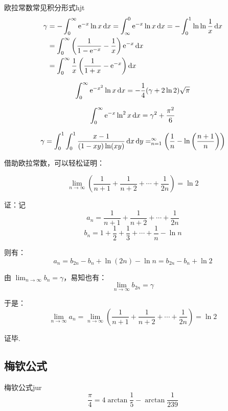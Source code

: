 \documentclass[12pt, cn]{elegantart}
\begin{document}
\begin{definition}{欧拉常数常见积分形式}{hjt}
	\begin{align*} 
	\gamma &=-\int_{0}^{\infty} \mathrm{e}^{-x} \ln x \mathop{}\!\mathrm{d} x=\int_{\infty}^{0} \mathrm{e}^{-x} \ln x \mathop{}\!\mathrm{d} x=-\int_{0}^{1} \ln \ln \frac{1}{x} \mathop{}\!\mathrm{d} x \\ &=\int_{0}^{\infty}\left(\frac{1}{1-\mathrm{e}^{-x}}-\frac{1}{x}\right) \mathrm{e}^{-x} \mathop{}\!\mathrm{d} x \\ &=\int_{0}^{\infty} \frac{1}{x}\left(\frac{1}{1+x}-\mathrm{e}^{-x}\right) \mathop{}\!\mathrm{d} x
	\end{align*}
	
	\begin{equation*}
		\int_{0}^{\infty} \mathrm{e}^{-x^{2}} \ln x \mathop{}\!\mathrm{d} x=-\frac{1}{4}(\gamma+2 \ln 2) \sqrt{\pi}
	\end{equation*}
	
	\begin{equation*}
		\int_{0}^{\infty} \mathrm{e}^{-x} \ln ^{2} x \mathop{}\!\mathrm{d} x=\gamma^{2}+\frac{\pi^{2}}{6}
	\end{equation*}
	
	\begin{equation*}
		\gamma=\int_{0}^{1} \int_{0}^{1} \frac{x-1}{(1-x y) \ln (x y)} \mathop{}\!\mathrm{d} x \mathop{}\!\mathrm{d} y=\relax_{n=1}^{\infty}\left(\frac{1}{n}-\ln\left( \frac{n+1}{n}\right)\right)
	\end{equation*}

	借助欧拉常数，可以轻松证明：
	
	$$\lim _{n \rightarrow \infty}\left(\frac{1}{n+1}+\frac{1}{n+2}+\cdots+\frac{1}{2 n}\right)=\ln 2$$

	证：记
	$$a_{n}=\frac{1}{n+1}+\frac{1}{n+2}+\cdots+\frac{1}{2 n}$$
	$$b_{n}=1+\frac{1}{2}+\frac{1}{3}+\cdots+\frac{1}{n} -\ln n$$
	
	则有：
	$$a_{n}=b_{2 n}-b_{n}+\ln (2 n)-\ln n=b_{2 n}-b_{n}+\ln 2$$
	
	由 $\displaystyle \lim_{n \rightarrow \infty} b_{n}=\gamma$，易知也有：
	$$\lim _{n \rightarrow \infty} b_{2 n}=\gamma$$
	
	于是：
	$$\lim _{n \rightarrow \infty} a_{n}=\lim _{n \rightarrow \infty}\left(\frac{1}{n+1}+\frac{1}{n+2}+\cdots+\frac{1}{2 n}\right)=\ln 2$$
	
	证毕.
\end{definition}


\subsection{梅钦公式}
\begin{theorem}{梅钦公式}{jur}
	\begin{equation}
		\frac{\pi}{4}=4 \arctan \frac{1}{5}-\arctan \frac{1}{239}
	\end{equation}
\end{theorem}
\end{document}

